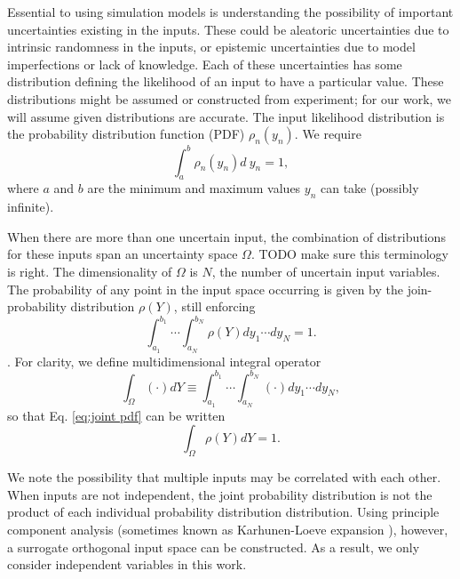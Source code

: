 Essential to using simulation models is understanding the possibility of important uncertainties existing in
the inputs.  These could be aleatoric uncertainties due to intrinsic randomness in the inputs, or epistemic
uncertainties due to model imperfections or lack of knowledge.  Each of these uncertainties has some
distribution defining the likelihood of an input to have a particular value.  These distributions might be
assumed or constructed from experiment; for our work, we will assume given distributions are accurate.  The
input likelihood distribution is the probability distribution function (PDF) $\rho_n(y_n)$.  We require
\begin{equation}
  \int_a^b \rho_n(y_n) d\ y_n = 1,
\end{equation}
where $a$ and $b$ are the minimum and maximum values $y_n$ can take (possibly infinite).

When there are more than one uncertain input, the combination of distributions for these inputs span an
uncertainty space $\Omega$. TODO make sure this terminology is right.  The dimensionality of $\Omega$ is $N$,
the number of uncertain input variables.  The probability of any point in the input space occurring is given
by the join-probability distribution $\rho(Y)$, still enforcing
\begin{equation} \label{eq:joint pdf}
  \int_{a_1}^{b_1}\cdots\int_{a_N}^{b_N} \rho(Y) dy_1\cdots dy_N = 1.
\end{equation}.
For clarity, we define multidimensional integral operator
\begin{equation}
  \int_\Omega (\cdot)dY\equiv \int_{a_1}^{b_1}\cdots\int_{a_N}^{b_N} (\cdot) dy_1\cdots dy_N,
\end{equation}
so that Eq. \ref{eq:joint pdf} can be written
\begin{equation}
  \int_\Omega \rho(Y) dY = 1.
\end{equation}

We note the possibility that multiple inputs may be correlated with each other.  When inputs are not
independent, the joint probability distribution is not the product of each individual probability distribution
distribution.  Using principle component analysis (sometimes known as Karhunen-Loeve expansion
\cite{karhunen}), however, a surrogate orthogonal input space can be
constructed.  As a result, we only consider independent variables in this work.



